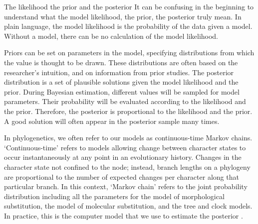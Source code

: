 \begin{boxedtext}{The likelihood the prior and the posterior} 
It can be confusing in the beginning to understand what the model likelihood, the prior,  the posterior truly mean.
In plain language, the model likelihood is the probability of the data given a model.
Without a model, there can be no calculation of the model  likelihood.

Priors can be set on parameters in the model, specifying distributions from which the value is thought to be drawn.
These distributions are often based on the researcher's intuition, and on information from prior studies.
The posterior distribution is a set of plausible solutions given the model likelihood and the prior.
During Bayesian estimation, different values will be sampled for model parameters.
Their probability will be evaluated according to the likelihood and the prior.
Therefore, the posterior is proportional to the likelihood and the prior.
A good solution will often appear in the posterior sample many times.

In phylogenetics, we often refer to our models as continuous-time Markov chains.
`Continuous-time' refers to models allowing change between character states to occur instantaneously at any point in an evolutionary history.
Changes in the character state  not confined to the node; instead, branch lengths on a phylogeny are proportional to the number of expected changes per character along that particular branch. 
In this context, `Markov chain' refers to the  joint probability distribution including all the parameters for the model of morphological substitution, the model of molecular substitution, and the tree and clock models. 
In practice, this is the computer model that we use to estimate the posterior \citep{Hoehna2016b}.
\end{boxedtext}

